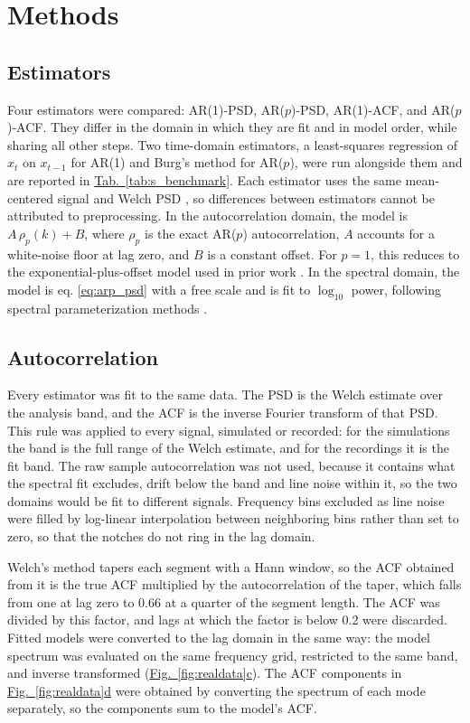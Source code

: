 \documentclass[pdflatex,lineno,sn-nature]{sn-jnl}
\newcommand{\figpanel}[3][]{\hyperref[#2]{Fig.~#1\ref*{#2}#3}}
\newcommand{\tabpanel}[2][]{\hyperref[#2]{Tab.~#1\ref*{#2}}}
\theoremstyle{thmstyleone}
\theoremstyle{thmstyletwo}
\theoremstyle{thmstylethree}
\begin{document}
\section{Methods}\label{sec:methods}

\subsection{Estimators}

Four estimators were compared: AR(1)-PSD, AR($p$)-PSD, AR(1)-ACF, and AR($p$)-ACF. They differ in the domain in which they are fit and in model order, while sharing all other steps. Two time-domain estimators, a least-squares regression of $x_t$ on $x_{t-1}$ for AR(1) and Burg's method \cite{burg_maximum_1975} for AR($p$), were run alongside them and are reported in \tabpanel{tab:s_benchmark}. Each estimator uses the same mean-centered signal and Welch PSD \cite{welch_use_1967}, so differences between estimators cannot be attributed to preprocessing. In the autocorrelation domain, the model is $A\,\rho_p(k) + B$, where $\rho_p$ is the exact AR($p$) autocorrelation, $A$ accounts for a white-noise floor at lag zero, and $B$ is a constant offset. For $p=1$, this reduces to the exponential-plus-offset model used in prior work \cite{murray_hierarchy_2014}. In the spectral domain, the model is eq. \ref{eq:arp_psd} with a free scale and is fit to $\log_{10}$ power, following spectral parameterization methods \cite{donoghue_parameterizing_2020}.

\subsection{Autocorrelation}

Every estimator was fit to the same data. The PSD is the Welch estimate over the analysis band, and the ACF is the inverse Fourier transform of that PSD. This rule was applied to every signal, simulated or recorded: for the simulations the band is the full range of the Welch estimate, and for the recordings it is the fit band. The raw sample autocorrelation was not used, because it contains what the spectral fit excludes, drift below the band and line noise within it, so the two domains would be fit to different signals. Frequency bins excluded as line noise were filled by log-linear interpolation between neighboring bins rather than set to zero, so that the notches do not ring in the lag domain.

Welch's method tapers each segment with a Hann window, so the ACF obtained from it is the true ACF multiplied by the autocorrelation of the taper, which falls from one at lag zero to 0.66 at a quarter of the segment length. The ACF was divided by this factor, and lags at which the factor is below 0.2 were discarded. Fitted models were converted to the lag domain in the same way: the model spectrum was evaluated on the same frequency grid, restricted to the same band, and inverse transformed (\figpanel{fig:realdata}{c}). The ACF components in \figpanel{fig:realdata}{d} were obtained by converting the spectrum of each mode separately, so the components sum to the model's ACF.
\end{document}
